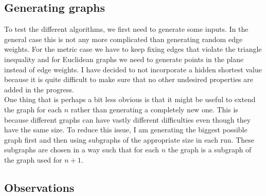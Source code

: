 \documentclass{article}
\begin{document}
\subsection{Generating graphs}

To test the different algorithms, we first need to generate some inputs.
In the general case this is not any more complicated than generating random
edge weights. For the metric case we have to keep fixing edges that violate
the triangle inequality and for Euclidean graphs we need to generate points
in the plane instead of edge weights. I have decided to not incorporate a
hidden shortest value because it is quite difficult to make sure that
no other undesired properties are added in the progress.\\
One thing that is perhaps a bit less obvious is that it might be useful
to extend the graph for each $n$ rather than generating a completely new one.
This is because different graphs can have vastly different difficulties even
though they have the same size. To reduce this issue, I am generating the
biggest possible graph first and then using subgraphs of the appropriate
size in each run. These subgraphs are chosen in a way such that
for each $n$ the graph is a subgraph of the graph used for $n+1$.

\subsection{Observations}
\end{document}
